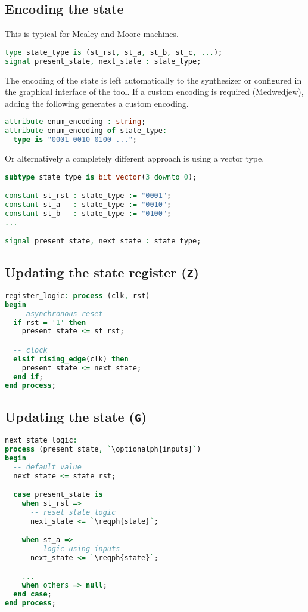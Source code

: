 \subsection{Encoding the state}
This is typical for Mealey and Moore machines.
\begin{lstlisting}[language=vhdl]
type state_type is (st_rst, st_a, st_b, st_c, ...);
signal present_state, next_state : state_type;
\end{lstlisting}
The encoding of the state is left automatically to the synthesizer or
configured in the graphical interface of the tool.  If a custom encoding is
required (Medwedjew), adding the following generates a custom encoding.
\begin{lstlisting}[language=vhdl]
attribute enum_encoding : string;
attribute enum_encoding of state_type:
  type is "0001 0010 0100 ...";
\end{lstlisting}

Or alternatively a completely different approach is using a vector type.
\begin{lstlisting}[language=vhdl]
subtype state_type is bit_vector(3 downto 0);

constant st_rst : state_type := "0001";
constant st_a   : state_type := "0010";
constant st_b   : state_type := "0100";
...

signal present_state, next_state : state_type;
\end{lstlisting}

\subsection{Updating the state register (\texttt{Z})}
\begin{lstlisting}[language=vhdl]
register_logic: process (clk, rst)
begin
  -- asynchronous reset
  if rst = '1' then
    present_state <= st_rst;

  -- clock
  elsif rising_edge(clk) then
    present_state <= next_state;
  end if;
end process;
\end{lstlisting}

\subsection{Updating the state (\texttt{G})}
\begin{lstlisting}[language=vhdl]
next_state_logic:
process (present_state, `\optionalph{inputs}`)
begin
  -- default value
  next_state <= state_rst;

  case present_state is
    when st_rst =>
      -- reset state logic
      next_state <= `\reqph{state}`;

    when st_a =>
      -- logic using inputs
      next_state <= `\reqph{state}`;

    ...
    when others => null;
  end case;
end process;
\end{lstlisting}

